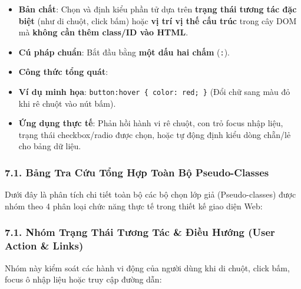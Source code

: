 \documentclass[11pt,oneside]{book}
\newcommand{\codeinline}[1]{\textcolor{accentOrange}{\texttt{#1}}}
\begin{document}
\begin{conceptBox}
\begin{itemize}[leftmargin=1.5em, itemsep=4pt, parsep=0pt]
    \item \textbf{Bản chất}: Chọn và định kiểu phần tử dựa trên \textbf{trạng thái tương tác đặc biệt} (như di chuột, click bấm) hoặc \textbf{vị trí vị thế cấu trúc} trong cây DOM mà \textbf{không cần thêm class/ID vào HTML}.
    \item \textbf{Cú pháp chuẩn}: Bắt đầu bằng \textbf{một dấu hai chấm} (\codeinline{:}).
    \item \textbf{Công thức tổng quát}:
    \par\vspace{3pt}
    \par\vspace{3pt}
    \item \textbf{Ví dụ minh họa}: \codeinline{button:hover \{ color: red; \}} (Đổi chữ sang màu đỏ khi rê chuột vào nút bấm).
    \item \textbf{Ứng dụng thực tế}: Phản hồi hành vi rê chuột, con trỏ focus nhập liệu, trạng thái checkbox/radio được chọn, hoặc tự động định kiểu dòng chẵn/lẻ cho bảng dữ liệu.
\end{itemize}
\end{conceptBox}

\subsubsection{7.1. Bảng Tra Cứu Tổng Hợp Toàn Bộ Pseudo-Classes}

Dưới đây là phân tích chi tiết toàn bộ các bộ chọn lớp giả (Pseudo-classes) được nhóm theo 4 phân loại chức năng thực tế trong thiết kế giao diện Web:

\subsubsection{7.1. Nhóm Trạng Thái Tương Tác \& Điều Hướng (User Action \& Links)}

Nhóm này kiểm soát các hành vi động của người dùng khi di chuột, click bấm, focus ô nhập liệu hoặc truy cập đường dẫn:
\end{document}

